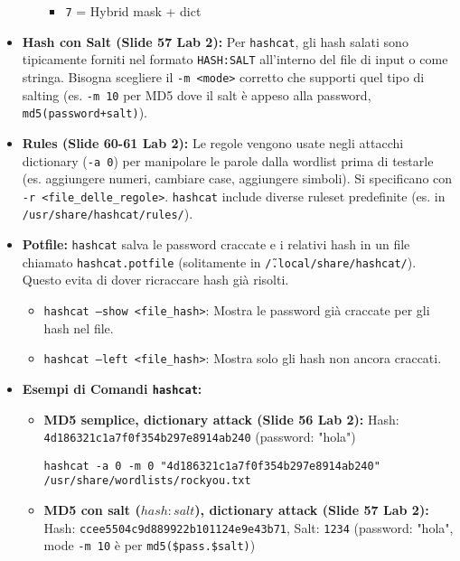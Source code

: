 \begin{itemize}
\begin{itemize}
\begin{itemize}
            \item \texttt{7} = Hybrid mask + dict
        \end{itemize}
    \end{itemize}
    \item \textbf{Hash con Salt (Slide 57 Lab 2):}
    Per \texttt{hashcat}, gli hash salati sono tipicamente forniti nel formato \texttt{HASH:SALT} all'interno del file di input o come stringa. Bisogna scegliere il \texttt{-m <mode>} corretto che supporti quel tipo di salting (es. \texttt{-m 10} per MD5 dove il salt è appeso alla password, \texttt{md5(password+salt)}).
    \item \textbf{Rules (Slide 60-61 Lab 2):}
    Le regole vengono usate negli attacchi dictionary (\texttt{-a 0}) per manipolare le parole dalla wordlist prima di testarle (es. aggiungere numeri, cambiare case, aggiungere simboli).
    Si specificano con \texttt{-r <file\_delle\_regole>}. \texttt{hashcat} include diverse ruleset predefinite (es. in \texttt{/usr/share/hashcat/rules/}).
    \item \textbf{Potfile:} \texttt{hashcat} salva le password craccate e i relativi hash in un file chiamato \texttt{hashcat.potfile} (solitamente in \texttt{\~/.local/share/hashcat/}). Questo evita di dover ricraccare hash già risolti.
    \begin{itemize}
        \item \texttt{hashcat --show <file\_hash>}: Mostra le password già craccate per gli hash nel file.
        \item \texttt{hashcat --left <file\_hash>}: Mostra solo gli hash non ancora craccati.
    \end{itemize}
    \item \textbf{Esempi di Comandi \texttt{hashcat}:}
    \begin{itemize}
        \item \textbf{MD5 semplice, dictionary attack (Slide 56 Lab 2):}
        Hash: \texttt{4d186321c1a7f0f354b297e8914ab240} (password: "hola")
\begin{verbatim}
hashcat -a 0 -m 0 "4d186321c1a7f0f354b297e8914ab240" /usr/share/wordlists/rockyou.txt
\end{verbatim}
        \item \textbf{MD5 con salt (\(hash:salt\)), dictionary attack (Slide 57 Lab 2):}
        Hash: \texttt{ccee5504c9d889922b101124e9e43b71}, Salt: \texttt{1234} (password: "hola", mode \texttt{-m 10} è per \texttt{md5(\$pass.\$salt)})
\begin{verbatim}

\end{verbatim}
\end{itemize}
\end{itemize}
